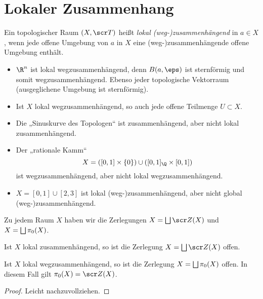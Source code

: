 \section{Lokaler Zusammenhang}


\begin{df}
	Ein topologischer Raum $(X, \scr T)$ heißt \emph{lokal (weg-)zusammenhängend} in $a \in X$, wenn jede offene Umgebung von $a$ in $X$ eine (weg-)zusammenhängende offene Umgebung enthält.
\end{df}

\begin{ex}
	\begin{itemize}
		\item
			$\R^n$ ist lokal wegzusammenhängend, denn $B(a,\eps)$ ist sternförmig und somit wegzusammenhängend.
			Ebenso jeder topologische Vektorraum (ausgeglichene Umgebung ist sternförmig).
		\item
			Ist $X$ lokal wegzusammenhängend, so auch jede offene Teilmenge $U \subset X$.
	\end{itemize}
\end{ex}

\begin{ex}
	\begin{itemize}
		\item
			Die „Sinuskurve des Topologen“ %
			ist zusammenhängend, aber nicht lokal zusammenhängend.
		\item
			Der „rationale Kamm“
			\[
				X = ([0,1] \times \{0\}) \cup ([0,1]_\Q \times [0,1])
			\]
			ist wegzusammenhängend, aber nicht lokal wegzusammenhängend.
		\item
			$X = [0,1] \cup [2,3]$ ist lokal (weg-)zusammenhängend, aber nicht global (weg-)zusammenhängend.
	\end{itemize}
\end{ex}

Zu jedem Raum $X$ haben wir die Zerlegungen $X = \bigdunion \scr Z(X)$ und $X = \bigsqcup \pi_0(X)$.

\begin{st}
	Ist $X$ lokal zusammenhängend, so ist die Zerlegung $X = \bigdunion \scr Z(X)$ offen.

	Ist $X$ lokal wegzusammenhängend, so ist die Zerlegung $X = \bigsqcup \pi_0(X)$ offen.
	In diesem Fall gilt $\pi_0(X) = \scr Z(X)$.
	\begin{proof}
		Leicht nachzuvollziehen.
	\end{proof}
\end{st}


